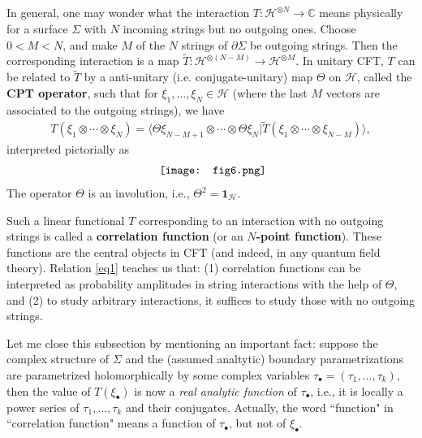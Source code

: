 \documentclass[11pt,b5paper,notitlepage]{article}
\theoremstyle{definition}
\theoremstyle{plain}
\newcommand{\mc}{\mathcal}
\newcommand{\wtd}{\widetilde}
\newcommand{\id}{\mathbf{1}}
\newcommand{\bk}[1]{\langle {#1}\rangle}
\newcommand{\blt}{\bullet}
\newcommand{\Cbb}{\mathbb C}
\numberwithin{equation}{section}
\begin{document}
\subsection{}\label{lb2}

In general, one may wonder what the interaction $T:\mc H^{\otimes N}\rightarrow \Cbb$ means physically for a surface $\Sigma$ with $N$ incoming strings but no outgoing ones.  Choose $0<M<N$, and make $M$ of the $N$ strings of $\partial\Sigma$ be outgoing strings. Then the corresponding interaction is a map $\wtd T:\mc H^{\otimes (N-M)}\rightarrow \mc H^{\otimes M}$. In unitary CFT, $T$ can be related to $\wtd T$ by a anti-unitary (i.e. conjugate-unitary) map $\Theta$  on $\mc H$, called the \textbf{CPT operator}, such that for $\xi_1,\dots,\xi_N\in\mc H$ (where the last $M$ vectors are associated to the outgoing strings), we have
\begin{align}
T(\xi_1\otimes\cdots\otimes\xi_N)=\bk{\Theta \xi_{N-M+1}\otimes\cdots\otimes \Theta \xi_N|\wtd T(\xi_1\otimes\cdots\otimes\xi_{N-M})},	\label{eq1}
\end{align}
interpreted pictorially as
\begin{align*}
	\vcenter{\hbox{{
				\texttt{[image: fig6.png]}}}}
\end{align*}
The operator $\Theta$ is an involution, i.e., $\Theta^2=\id_{\mc H}$.

Such a linear functional $T$ corresponding to an interaction with no outgoing strings is called a \textbf{correlation function} (or an \textbf{$N$-point function}). These functions are the central objects in CFT (and indeed, in any quantum field theory). Relation \eqref{eq1} teaches us that: (1) correlation functions can be interpreted as probability amplitudes in string interactions with the help of $\Theta$, and (2) to study arbitrary interactions, it suffices to study those with no outgoing strings.

Let me close this subsection by mentioning an important fact: suppose the complex structure of $\Sigma$ and the (assumed analtytic) boundary parametrizations are parametrized holomorphically by some complex variables $\tau_\blt=(\tau_1,\dots,\tau_k)$, then the value of $T(\xi_\blt)$ is now a \emph{real analytic function} of $\tau_\blt$, i.e., it is locally a power series of $\tau_1,\dots,\tau_k$ and their conjugates. Actually, the word ``function" in ``correlation function" means a function of $\tau_\blt$, but not of $\xi_\blt$.
\end{document}
